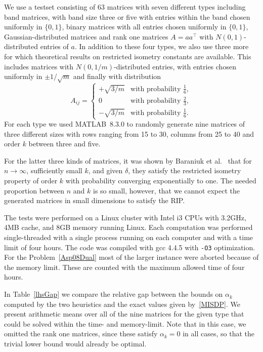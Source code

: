 \documentclass[journal]{IEEEtran}
\newcommand{\T}{^{\top}}
\begin{document}
We use a testset consisting of 63 matrices with seven 
different types including band matrices, 
with band size three or five with entries within the band chosen uniformly in $\{0,1\}$, binary matrices with all entries chosen 
uniformly in $\{0,1\}$, Gaussian-distributed matrices and rank one 
matrices $A = aa\T$ with $N(0,1)$-distributed entries of $a$. In addition to these four types,
we also use three more for which theoretical results on restricted isometry
constants are available. This includes matrices with 
$N(0, 1/m)$-distributed entries, with entries chosen uniformly in $\pm 1/\sqrt{m}$ and finally with distribution
\begin{equation}\nonumber
  A_{ij} = \begin{cases}
    + \sqrt{3/m} & \text{with probability } \frac{1}{6}, \\
    0 & \text{with probability } \frac{2}{3}, \\
    - \sqrt{3/m} & \text{with probability } \frac{1}{6}.
  \end{cases}
\end{equation}
For each type we used \mbox{MATLAB 8.3.0} to randomly generate nine
matrices of three different sizes with rows ranging from 15 to 30, columns
from 25 to 40 and order $k$ between three and five.

For the latter three kinds of matrices, it was shown by Baraniuk et al.~\cite{BDDW08} that for $n \rightarrow \infty$, 
sufficiently small $k$, and given $\delta$, they satisfy the restricted isometry property of order $k$  
with probability converging exponentially to one. The needed proportion between $n$ and $k$ is so small, however,
that we cannot expect the generated matrices in small dimensions to satisfy the RIP.

The tests were performed on a Linux cluster with Intel i3 CPUs with 3.2GHz, 4MB cache, and 8GB memory running
Linux. Each computation was performed single-threaded with a single process running on each computer and with 
a time limit of four hours. The code was compiled with gcc 4.4.5 with \texttt{-O3} optimization. For the 
Problem~\eqref{Asp08Dual} most of the larger instance were aborted because of the memory limit. These are
counted with the maximum allowed time of four hours. 

In Table~\ref{lhsGap} we compare the relative gap between the bounds on $\alpha_k$ computed by the two heuristics
and the exact values given by~\eqref{MISDP}. We present arithmetic means over all of the nine matrices for the given type that
could be solved within the time- and memory-limit. Note that in this case, we omitted the rank one matrices, since these satisfy
$\alpha_k = 0$ in all cases, so that the trivial lower bound would already
be optimal.
\end{document}

